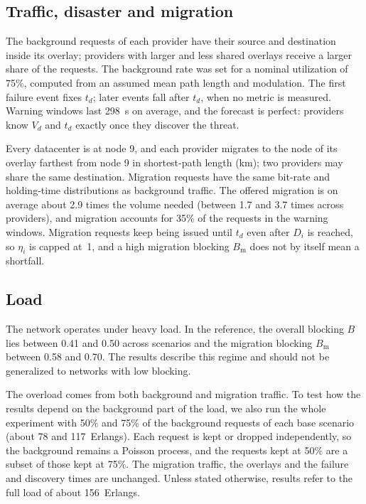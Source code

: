 \documentclass[11pt,a4paper]{article}
\theoremstyle{definition}
\begin{document}
\subsection{Traffic, disaster and migration}

The background requests of each provider have their source and destination inside its overlay; providers with larger and less shared overlays receive a larger share of the requests.
The background rate was set for a nominal utilization of 75\%, computed from an assumed mean path length and modulation.
The first failure event fixes $t_d$; later events fall after $t_d$, when no metric is measured.
Warning windows last 298~s on average, and the forecast is perfect: providers know $V_d$ and $t_d$ exactly once they discover the threat.

Every datacenter is at node 9, and each provider migrates to the node of its overlay farthest from node 9 in shortest-path length (km); two providers may share the same destination.
Migration requests have the same bit-rate and holding-time distributions as background traffic.
The offered migration is on average about 2.9 times the volume needed (between 1.7 and 3.7 times across providers), and migration accounts for 35\% of the requests in the warning windows.
Migration requests keep being issued until $t_d$ even after $D_i$ is reached, so $\eta_i$ is capped at~1, and a high migration blocking $B_\mathrm{m}$ does not by itself mean a shortfall.

\subsection{Load}

The network operates under heavy load.
In the reference, the overall blocking $B$ lies between 0.41 and 0.50 across scenarios and the migration blocking $B_\mathrm{m}$ between 0.58 and 0.70.
The results describe this regime and should not be generalized to networks with low blocking.

The overload comes from both background and migration traffic. To test how the results depend on the background part of the load, we also run the whole experiment with 50\% and 75\% of the background requests of each base scenario (about 78 and 117~Erlangs).
Each request is kept or dropped independently, so the background remains a Poisson process, and the requests kept at 50\% are a subset of those kept at 75\%. The migration traffic, the overlays and the failure and discovery times are unchanged.
Unless stated otherwise, results refer to the full load of about 156~Erlangs.
\end{document}
